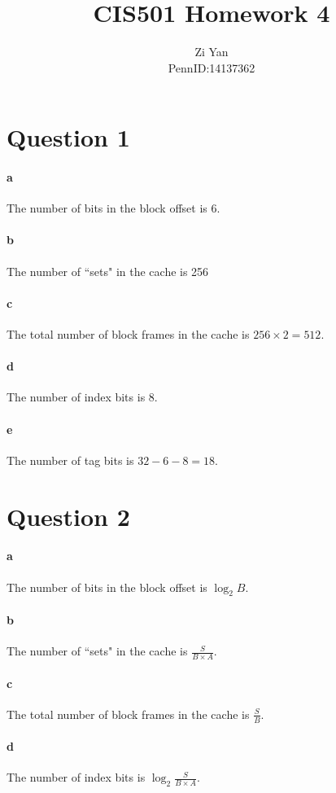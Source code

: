 \documentclass[12pt,letterpaper]{article}
\author{Zi Yan\\PennID:14137362}
\title{CIS501 Homework 4}
\date{}
\begin{document}
\maketitle

\section*{Question 1}
\paragraph*{a}
The number of bits in the block offset is 6.
\paragraph*{b}
The number of ``sets" in the cache is 256
\paragraph*{c}
The total number of block frames in the cache is $256\times2=512$.
\paragraph*{d}
The number of index bits is 8.
\paragraph*{e}
The number of tag bits is $32-6-8=18$.

\section*{Question 2}
\paragraph*{a}
The number of bits in the block offset is $\log_2B$.
\paragraph*{b}
The number of ``sets" in the cache is $\frac{S}{B\times A}$.
\paragraph*{c}
The total number of block frames in the cache is $\frac{S}{B}$.
\paragraph*{d}
The number of index bits is $\log_2\frac{S}{B\times A}$.
\end{document}
